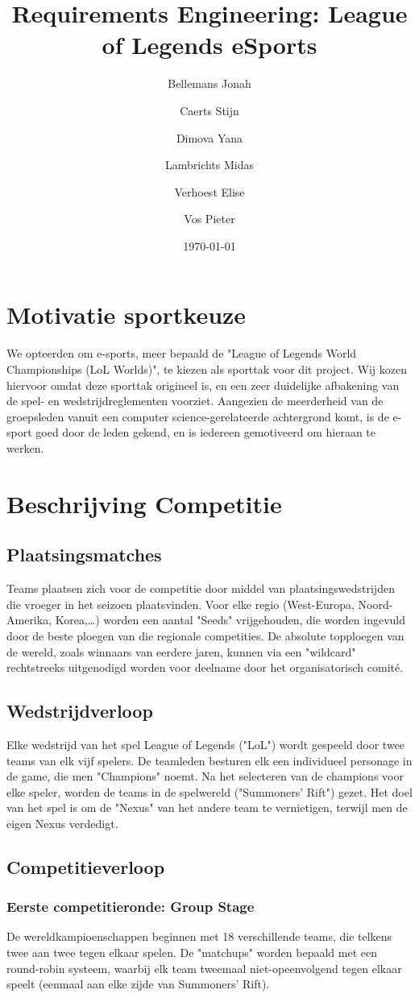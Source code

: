 \documentclass[12pt,a4paper]{article}
\title{Requirements Engineering: League of Legends eSports}
\author{Bellemans Jonah \and Caerts Stijn \and Dimova Yana \and Lambrichts Midas \and Verhoest Elise \and Vos Pieter}
\date{\today}
\begin{document}
	\maketitle
	\newpage
	\tableofcontents
	\newpage
	\section{Motivatie sportkeuze}
		We opteerden om e-sports, meer bepaald de "League of Legends World Championships (LoL Worlds)", te kiezen als sporttak voor dit project. Wij kozen hiervoor omdat deze sporttak origineel is, en een zeer duidelijke afbakening van de spel- en wedstrijdreglementen voorziet. Aangezien de meerderheid van de groepsleden vanuit een computer science-gerelateerde achtergrond komt, is de e-sport goed door de leden gekend, en is iedereen gemotiveerd om hieraan te werken.
	\section{Beschrijving Competitie}
		\subsection{Plaatsingsmatches}
			Teams plaatsen zich voor de competitie door middel van plaatsingswedstrijden die vroeger in het seizoen plaatsvinden. Voor elke regio (West-Europa, Noord-Amerika, Korea,\dots) worden een aantal "Seeds" vrijgehouden, die worden ingevuld door de beste ploegen van die regionale competities. De absolute topploegen van de wereld, zoals winnaars van eerdere jaren, kunnen via een "wildcard" rechtstreeks uitgenodigd worden voor deelname door het organisatorisch comité.
		\subsection{Wedstrijdverloop}
			Elke wedstrijd van het spel League of Legends ("LoL") wordt gespeeld door twee teams van elk vijf spelers. De teamleden besturen elk een individueel personage in de game, die men "Champions" noemt. Na het selecteren van de champions voor elke speler, worden de teams in de spelwereld ("Summoners' Rift") gezet. Het doel van het spel is om de "Nexus" van het andere team te vernietigen, terwijl men de eigen Nexus verdedigt.
		\subsection{Competitieverloop}
			\subsubsection{Eerste competitieronde: Group Stage}
				De wereldkampioenschappen beginnen met 18 verschillende teams, die telkens twee aan twee tegen elkaar spelen. De "matchups" worden bepaald met een round-robin systeem, waarbij elk team tweemaal niet-opeenvolgend tegen elkaar speelt (eenmaal aan elke zijde van Summoners' Rift).
\end{document}

